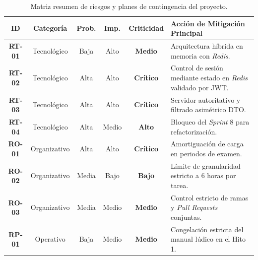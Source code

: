 \begin{table}[H]
    \centering
    \renewcommand{\arraystretch}{1.3}
    \small
    \begin{tabular}{|c|c|c|c|c|p{6cm}|}
        \hline
        \textbf{ID} & \textbf{Categoría} & \textbf{Prob.} & \textbf{Imp.} & \textbf{Criticidad} & \textbf{Acción de Mitigación Principal} \\
        \hline
        \textbf{RT-01} & Tecnológico & Baja & Alto & \textbf{Medio} & Arquitectura híbrida en memoria con \textit{Redis}. \\ \hline
        \textbf{RT-02} & Tecnológico & Alta & Alto & \textbf{Crítico} & Control de sesión mediante estado en \textit{Redis} validado por JWT. \\ \hline
        \textbf{RT-03} & Tecnológico & Alta & Alto & \textbf{Crítico} & Servidor autoritativo y filtrado asimétrico DTO. \\ \hline
        \textbf{RT-04} & Tecnológico & Alta & Medio & \textbf{Alto} & Bloqueo del \textit{Sprint} 8 para refactorización. \\ \hline
        \textbf{RO-01} & Organizativo & Alta & Alto & \textbf{Crítico} & Amortiguación de carga en periodos de examen. \\ \hline
        \textbf{RO-02} & Organizativo & Media & Bajo & \textbf{Bajo} & Límite de granularidad estricto a 6 horas por tarea. \\ \hline
        \textbf{RO-03} & Organizativo & Media & Medio & \textbf{Medio} & Control estricto de ramas y \textit{Pull Requests} conjuntas. \\ \hline
        \textbf{RP-01} & Operativo & Baja & Medio & \textbf{Medio} & Congelación estricta del manual lúdico en el Hito 1. \\ \hline
    \end{tabular}
    \caption{Matriz resumen de riesgos y planes de contingencia del proyecto.}
    \label{tab:matriz_riesgos}
\end{table}

%


